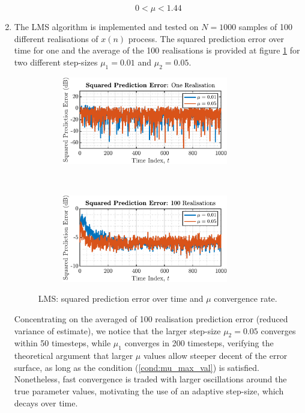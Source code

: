 \begin{enumerate}[label=\alph*), leftmargin=*]
\begin{equation}
    0 < \mu < 1.44
\label{cond:mu_max_val}
\end{equation}

\item
%

The LMS algorithm is implemented and tested on $N=1000$ samples of 100 different realisations of $x(n)$ process. The squared prediction error over time
for one and the average of the 100 realisations is provided at figure \ref{fig:3_1_b} for two different step-sizes $\mu_{1} = 0.01$ and $\mu_{2} = 0.05$.

\begin{figure}[h]
    \centering
    \begin{subfigure}{0.49\textwidth}
        \centering
        \includegraphics[height=1.5in]{report/adaptive-signal-processing/the-least-mean-square-algorithm/assets/b/squared_prediction_error_1}
    \end{subfigure}
    ~
    \begin{subfigure}{0.49\textwidth}
        \centering
        \includegraphics[height=1.5in]{report/adaptive-signal-processing/the-least-mean-square-algorithm/assets/b/squared_prediction_error_ens}
    \end{subfigure}
    \caption{LMS: squared prediction error over time and $\mu$ convergence rate.}
    \label{fig:3_1_b}
\end{figure}

Concentrating on the averaged of 100 realisation prediction error (reduced variance of estimate), we notice that the larger step-size $\mu_{2} = 0.05$ converges
within 50 timesteps, while $\mu_{1}$ converges in 200 timesteps, verifying the theoretical argument that larger $\mu$ values allow steeper decent of the error surface,
as long as the condition (\ref{cond:mu_max_val}) is satisfied. Nonetheless, fast convergence is traded with larger oscillations around the true parameter values,
motivating the use of an adaptive step-size, which decays over time.


\end{enumerate}
